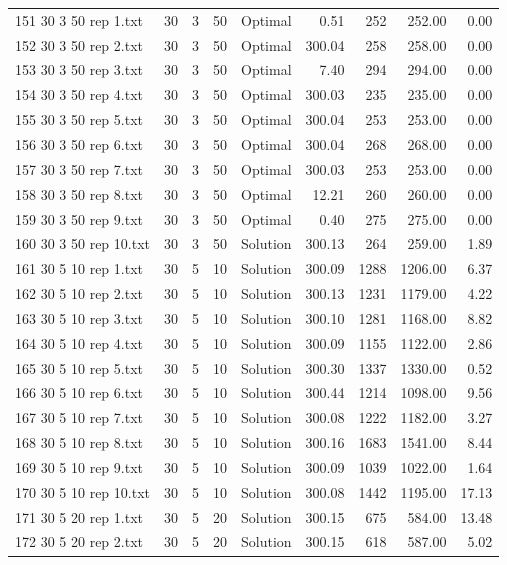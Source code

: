 \begin{longtable}{lrrllrrrr}
151 30 3 50 rep 1.txt & 30 & 3 & 50 & Optimal &  0.51 & 252 & 252.00 &  0.00\\
152 30 3 50 rep 2.txt & 30 & 3 & 50 & Optimal & 300.04 & 258 & 258.00 &  0.00\\
153 30 3 50 rep 3.txt & 30 & 3 & 50 & Optimal &  7.40 & 294 & 294.00 &  0.00\\
154 30 3 50 rep 4.txt & 30 & 3 & 50 & Optimal & 300.03 & 235 & 235.00 &  0.00\\
155 30 3 50 rep 5.txt & 30 & 3 & 50 & Optimal & 300.04 & 253 & 253.00 &  0.00\\
156 30 3 50 rep 6.txt & 30 & 3 & 50 & Optimal & 300.04 & 268 & 268.00 &  0.00\\
157 30 3 50 rep 7.txt & 30 & 3 & 50 & Optimal & 300.03 & 253 & 253.00 &  0.00\\
158 30 3 50 rep 8.txt & 30 & 3 & 50 & Optimal & 12.21 & 260 & 260.00 &  0.00\\
159 30 3 50 rep 9.txt & 30 & 3 & 50 & Optimal &  0.40 & 275 & 275.00 &  0.00\\
160 30 3 50 rep 10.txt & 30 & 3 & 50 & Solution & 300.13 & 264 & 259.00 &  1.89\\
161 30 5 10 rep 1.txt & 30 & 5 & 10 & Solution & 300.09 & 1288 & 1206.00 &  6.37\\
162 30 5 10 rep 2.txt & 30 & 5 & 10 & Solution & 300.13 & 1231 & 1179.00 &  4.22\\
163 30 5 10 rep 3.txt & 30 & 5 & 10 & Solution & 300.10 & 1281 & 1168.00 &  8.82\\
164 30 5 10 rep 4.txt & 30 & 5 & 10 & Solution & 300.09 & 1155 & 1122.00 &  2.86\\
165 30 5 10 rep 5.txt & 30 & 5 & 10 & Solution & 300.30 & 1337 & 1330.00 &  0.52\\
166 30 5 10 rep 6.txt & 30 & 5 & 10 & Solution & 300.44 & 1214 & 1098.00 &  9.56\\
167 30 5 10 rep 7.txt & 30 & 5 & 10 & Solution & 300.08 & 1222 & 1182.00 &  3.27\\
168 30 5 10 rep 8.txt & 30 & 5 & 10 & Solution & 300.16 & 1683 & 1541.00 &  8.44\\
169 30 5 10 rep 9.txt & 30 & 5 & 10 & Solution & 300.09 & 1039 & 1022.00 &  1.64\\
170 30 5 10 rep 10.txt & 30 & 5 & 10 & Solution & 300.08 & 1442 & 1195.00 & 17.13\\
171 30 5 20 rep 1.txt & 30 & 5 & 20 & Solution & 300.15 & 675 & 584.00 & 13.48\\
172 30 5 20 rep 2.txt & 30 & 5 & 20 & Solution & 300.15 & 618 & 587.00 &  5.02\\

\end{longtable}
